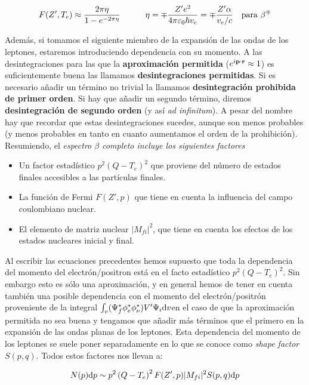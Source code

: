 \begin{eqnarray}
	F(Z',T_e) \approx \frac{2\pi \eta}{1-e^{-2\pi \eta}} \quad \quad \quad \eta = \mp \frac{Z'e^2}{4\pi \varepsilon_0 \hbar v_e} = \mp \frac{Z' \alpha}{v_e/c} \quad \text{para} \ \beta^{\mp}
\end{eqnarray}

Además, si tomamos el siguiente miembro de la expansión de las ondas de los leptones, estaremos introduciendo dependencia con su momento. A las desintegraciones para las que la \textbf{aproximación permitida} ($e^{i\mathbf{p} \cdot \mathbf{r}}\approx 1$) es suficientemente buena las llamamos \textbf{desintegraciones permitidas}. Si es necesario añadir un término no trivial la llamamos \textbf{desintegración prohibida de primer orden}. Si hay que añadir un segundo término, diremos \textbf{desintegración de segundo orden} (y así \textit{ad infinitum}). A pesar del nombre hay que recordar que estas desintegraciones sucedes, aunque son menos probables (y menos probables en tanto en cuanto aumentamos el orden de la prohibición). Resumiendo, el \textit{espectro $\beta$ completo incluye los siguientes factores}

\begin{itemize}
	\item Un factor estadístico $p^2 (Q-T_e)^2$ que proviene del número de estados finales accesibles a las partículas finales.
	\item La función de Fermi $F(Z',p)$ que tiene en cuenta la influencia del campo coulombiano nuclear.
	\item El elemento de matriz nuclear $|M_{fi}|^2$, que tiene en cuenta los efectos de los estados nucleares inicial y final.
\end{itemize}

Al escribir las ecuaciones precedentes hemos supuesto que toda la dependencia del momento del electrón/positron está en el facto estadístico $p^2(Q-T_e)^2$. Sin embargo esto es sólo una aproximación, y en general hemos de tener en cuenta también una posible dependencia con el momento del electrón/positrón proveniente de la integral $\int_v (\Psi_f^* \phi_e^* \phi_\nu^*) V' \Psi_i \mathrm{d} v$en el caso de que la aproximación permitida no sea buena y tengamos que añadir más términos que el primero en la expansión de las ondas planas de los leptones. Esta dependencia del momento de los leptones se suele poner separadamente en lo que se conoce como \textit{shape factor} $S(p,q)$. Todos estos factores nos llevan a:

\begin{eqnarray}
	N(p) \mathrm{d} p \sim p^2 \left( Q-T_e \right)^2 F(Z',p) |M_{fi}|^2 S(p,q) \mathrm{d} p
\end{eqnarray}


